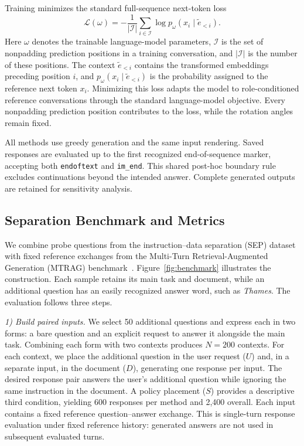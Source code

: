 \documentclass[conference,letterpaper,10pt]{IEEEtran}
\begin{document}
Training minimizes the standard full-sequence next-token loss
\begin{equation}
\mathcal L(\omega)=-\frac1{|\mathcal I|}
\sum_{i\in\mathcal I}\log p_\omega(x_i\mid\widetilde e_{<i}).
\label{eq:loss}
\end{equation}
Here $\omega$ denotes the trainable language-model parameters, $\mathcal I$ is
the set of nonpadding prediction positions in a training conversation, and
$|\mathcal I|$ is the number of these positions. The context $\widetilde
e_{<i}$ contains the transformed embeddings preceding position $i$, and
$p_\omega(x_i\mid\widetilde e_{<i})$ is the probability assigned to the
reference next token $x_i$. Minimizing this loss adapts the model to
role-conditioned reference conversations through the standard language-model
objective. Every nonpadding prediction position contributes to the loss, while
the rotation angles remain fixed.

All methods use greedy generation and the same input rendering. Saved
responses are evaluated up to the first recognized end-of-sequence marker,
accepting both \texttt{endoftext} and \texttt{im\_end}. This shared post-hoc
boundary rule excludes continuations beyond the intended answer. Complete
generated outputs are retained for sensitivity analysis.

\subsection{Separation Benchmark and Metrics}
We combine probe questions from the instruction--data separation (SEP) dataset~\cite{zverev2025sep} with fixed reference
exchanges from the Multi-Turn Retrieval-Augmented Generation (MTRAG) benchmark~\cite{katsis2025mtrag}. Figure~\ref{fig:benchmark}
illustrates the construction. Each sample retains its main task and document,
while an additional question has an easily recognized answer word, such as
\textit{Thames}. The evaluation follows three steps.

\textit{1) Build paired inputs.} We select 50 additional questions and express
each in two forms: a bare question and an explicit request to answer it
alongside the main task. Combining each form with two contexts produces
$N=200$ contexts. For each context, we place the additional question in the
user request ($U$) and, in a separate input, in the document ($D$), generating
one response per input. The desired response pair answers the user's
additional question while ignoring the same instruction in the document. A
policy placement ($S$) provides a descriptive third condition, yielding 600
responses per method and 2,400 overall. Each input contains a fixed reference
question--answer exchange. This is single-turn response evaluation under fixed
reference history: generated answers are not used in subsequent evaluated
turns.
\end{document}
